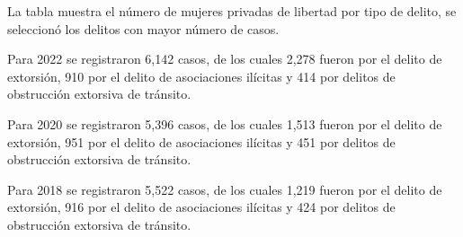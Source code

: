 La tabla muestra el número de mujeres privadas de libertad por tipo de delito, se seleccionó los delitos con mayor número de casos. 

Para 2022 se registraron 6,142 casos, de los cuales 2,278 fueron por el delito de extorsión, 910 por el delito de asociaciones ilícitas y 414 por delitos de obstrucción extorsiva de tránsito.

Para 2020 se registraron 5,396 casos, de los cuales 1,513 fueron por el delito de extorsión, 951 por el delito de asociaciones ilícitas y 451 por delitos de obstrucción extorsiva de tránsito.

Para 2018 se registraron 5,522 casos, de los cuales 1,219 fueron por el delito de extorsión, 916 por el delito de asociaciones ilícitas y 424 por delitos de obstrucción extorsiva de tránsito.